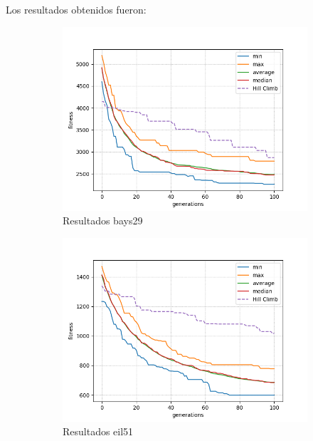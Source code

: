 \documentclass[twocolumn]{IEEEtran}
\begin{document}
Los resultados obtenidos fueron:

\begin{figure}
    \centering
    \begin{subfigure}[b]{1\linewidth}
        \includegraphics[width=\linewidth]{figures/tsp29.png}
        \caption{Resultados bays29}
    \end{subfigure}
    \begin{subfigure}[b]{1\linewidth}
        \includegraphics[width=\linewidth]{figures/tsp_51.png}
        \caption{Resultados eil51}
    \end{subfigure}
    \begin{subfigure}[b]{1\linewidth}

\end{subfigure}
\end{figure}
\end{document}

